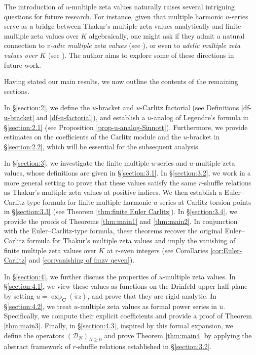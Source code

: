 \documentclass[12pt,reqno]{amsart}
\numberwithin{equation}{section}
\theoremstyle{plain}
\theoremstyle{definition}
\theoremstyle{remark}
\newcommand{\Dcal}{\mathcal{D}}
\newcommand{\cpi}{\tilde{\pi}}
\newcommand{\C}{\mathbf{C}}
\begin{document}
\medskip
The introduction of $u$-multiple zeta values naturally raises several intriguing questions for future research. For instance, given that multiple harmonic $u$-series serve as a bridge between Thakur's multiple zeta values analytically and finite multiple zeta values over $K$ algebraically, one might ask if they admit a natural connection to \textit{$v$-adic multiple zeta values} (see \cite{CM19, CM21, CCM22}), or even to \textit{adelic multiple zeta values over $K$} (see \cite{Chen23}). The author aims to explore some of these directions in future work.

\medskip
Having stated our main results, we now outline the contents of the remaining sections. 

In \S\ref{section:2}, we define the $u$-bracket and $u$-Carlitz factorial (see Definitions \ref{df-u-bracket} and \ref{df-u-factorial}), and establish a $u$-analog of Legendre's formula in \S\ref{section:2.1} (see Proposition \ref{prop-u-analog-Sinnott}). Furthermore, we provide estimates on the coefficients of the Carlitz module and the $u$-bracket in \S\ref{section:2.2}, which will be essential for the subsequent analysis. 

In \S\ref{section:3}, we investigate the finite multiple $u$-series and $u$-multiple zeta values, whose definitions are given in \S\ref{section:3.1}. In \S\ref{section:3.2}, we work in a more general setting to prove that these values satisfy the same $r$-shuffle relations as Thakur's multiple zeta values at positive indices. We then establish a Euler--Carlitz-type formula for finite multiple harmonic $u$-series at Carlitz torsion points in \S\ref{section:3.3} (see Theorem \ref{thm:finite Euler Carlitz}). In \S\ref{section:3.4}, we provide the proofs of Theorems \ref{thm:main1} and \ref{thm:main2}. In conjunction with the Euler--Carlitz-type formula, these theorems recover the original Euler--Carlitz formula for Thakur's multiple zeta values and imply the vanishing of finite multiple zeta values over $K$ at $r$-even integers (see Corollaries \ref{cor:Euler-Carlitz} and \ref{cor:vanishing of fmzv qeven}). 

In \S\ref{section:4}, we further discuss the properties of $u$-multiple zeta values. In \S\ref{section:4.1}, we view these values as functions on the Drinfeld upper-half plane by setting $u = \exp_\C(\cpi z)$, and prove that they are rigid analytic. In \S\ref{section:4.2}, we treat $u$-multiple zeta values as formal power series in $u$. Specifically, we compute their explicit coefficients and provide a proof of Theorem \ref{thm:main3}. Finally, in \S\ref{section:4.3}, inspired by this formal expansion, we define the operators $(\Dcal_N)_{N \geq 0}$ and prove Theorem \ref{thm:main4} by applying the abstract framework of $r$-shuffle relations established in \S\ref{section:3.2}.
\end{document}
